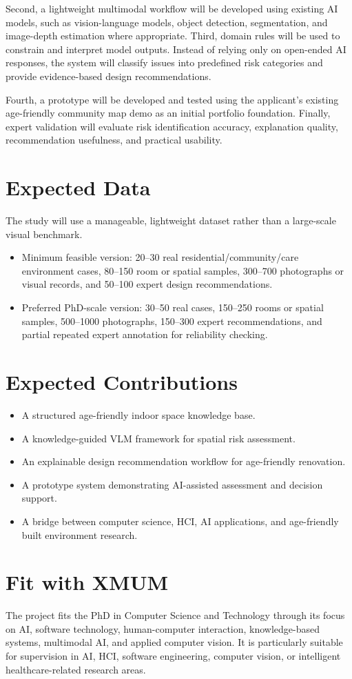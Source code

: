 \documentclass[11pt,a4paper]{article}
\begin{document}
Second, a lightweight multimodal workflow will be developed using existing AI models, such as vision-language models, object detection, segmentation, and image-depth estimation where appropriate. Third, domain rules will be used to constrain and interpret model outputs. Instead of relying only on open-ended AI responses, the system will classify issues into predefined risk categories and provide evidence-based design recommendations.

Fourth, a prototype will be developed and tested using the applicant's existing age-friendly community map demo as an initial portfolio foundation. Finally, expert validation will evaluate risk identification accuracy, explanation quality, recommendation usefulness, and practical usability.

\section*{Expected Data}
The study will use a manageable, lightweight dataset rather than a large-scale visual benchmark.

\begin{itemize}
  \item Minimum feasible version: 20--30 real residential/community/care environment cases, 80--150 room or spatial samples, 300--700 photographs or visual records, and 50--100 expert design recommendations.
  \item Preferred PhD-scale version: 30--50 real cases, 150--250 rooms or spatial samples, 500--1000 photographs, 150--300 expert recommendations, and partial repeated expert annotation for reliability checking.
\end{itemize}

\section*{Expected Contributions}
\begin{itemize}
  \item A structured age-friendly indoor space knowledge base.
  \item A knowledge-guided VLM framework for spatial risk assessment.
  \item An explainable design recommendation workflow for age-friendly renovation.
  \item A prototype system demonstrating AI-assisted assessment and decision support.
  \item A bridge between computer science, HCI, AI applications, and age-friendly built environment research.
\end{itemize}

\section*{Fit with XMUM}
The project fits the PhD in Computer Science and Technology through its focus on AI, software technology, human-computer interaction, knowledge-based systems, multimodal AI, and applied computer vision. It is particularly suitable for supervision in AI, HCI, software engineering, computer vision, or intelligent healthcare-related research areas.
\end{document}

